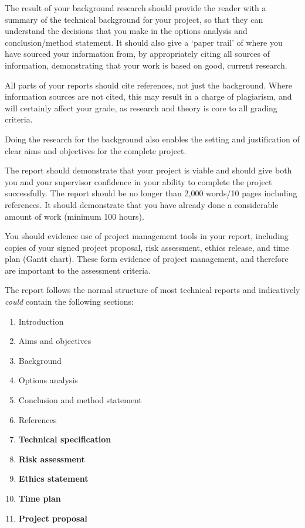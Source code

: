 The result of your background research should provide the reader with a summary of the technical background for your project, so that they can understand the decisions that you make in the options analysis and conclusion/method statement. It should also give a ‘paper trail’ of where you have sourced your information from, by appropriately citing all sources of information, demonstrating that your work is based on good, current research. 

All parts of your reports should cite references, not just the background. Where information sources are not cited, this may result in a charge of plagiarism, and will certainly affect your grade, as research and theory is core to all grading criteria.

Doing the research for the background also enables the setting and justification of clear aims and objectives for the complete project.

The report should demonstrate that your project is viable and should give both you and your supervisor confidence in your ability to complete the project successfully. The report should be no longer than 2,000 words/10 pages including references. It should demonstrate that you have already done a considerable amount of work (minimum 100 hours).

You should evidence use of project management tools in your report, including copies of your signed project proposal, risk assessment, ethics release, and time plan (Gantt chart). These form evidence of project management, and therefore are important to the assessment criteria. 

The report follows the normal structure of most technical reports and indicatively \textit{could} contain the following sections:

\begin{enumerate}
    \item Introduction
    \item Aims and objectives
    \item Background
    \item Options analysis
    \item Conclusion and method statement
    \item References
    \item \textbf{Technical specification}
    \item \textbf{Risk assessment}
    \item \textbf{Ethics statement}
    \item \textbf{Time plan}
    \item \textbf{Project proposal}
\end{enumerate}

